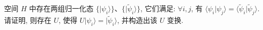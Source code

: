 \documentclass{assignment}
\begin{document}
\begin{prob}
    空间 $H$ 中存在两组归一化态 $\{\lvert\psi_i\rangle\}$、$\{\lvert\tilde{\psi}_i\rangle\}$, 它们满足: $\forall i,j$, 有 $\langle\psi_i\vert\psi_j\rangle=\langle\tilde{\psi}_i\vert\tilde{\psi}_j\rangle$. 请证明, 则存在 $U$, 使得 $U\lvert\psi_i\rangle=\lvert\tilde{\psi}_i\rangle$, 并构造出该 $U$ 变换.
\end{prob}
\begin{sol}



\end{sol}
\end{document}
